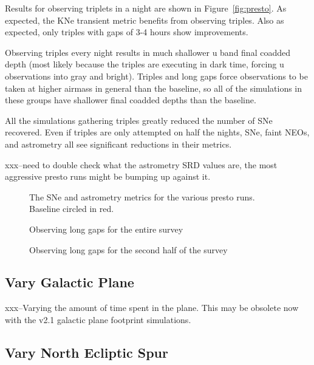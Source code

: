 Results for observing triplets in a night are shown in Figure~\ref{fig:presto}. As expected, the KNe transient metric benefits from observing triples. Also as expected, only triples with gaps of 3-4 hours show improvements.  

Observing triples every night results in much shallower u band final coadded depth (most likely because the triples are executing in dark time, forcing u observations into gray and bright). Triples and long gaps force observations to be taken at higher airmass in general than the baseline, so all of the simulations in these groups have shallower final coadded depths than the baseline.

All the simulations gathering triples greatly reduced the number of SNe recovered. Even if triples are only attempted on half the nights, SNe, faint NEOs, and astrometry all see significant reductions in their metrics.


xxx--need to double check what the astrometry SRD values are, the most aggressive presto runs might be bumping up against it.

\begin{figure}
\caption{The SNe and astrometry metrics for the various presto runs. Baseline circled in red. \label{fig:presto_metics} }
\end{figure}


\begin{figure}
\caption{Observing long gaps for the entire survey}
\end{figure}

\begin{figure}
\caption{Observing long gaps for the second half of the survey}
\end{figure}


\subsection{Vary Galactic Plane}

xxx--Varying the amount of time spent in the plane. This may be obsolete now with the v2.1 galactic plane footprint simulations. 


\subsection{Vary North Ecliptic Spur}

